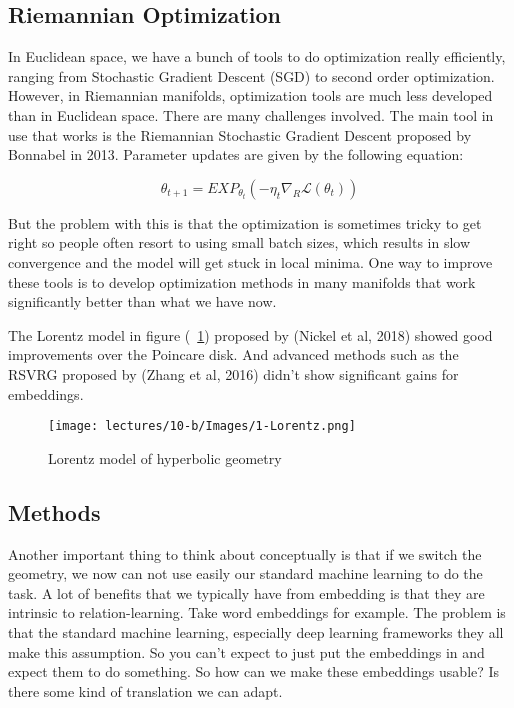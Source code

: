\subsection{Riemannian Optimization}

In Euclidean space, we have a bunch of tools to do optimization really efficiently, ranging from Stochastic Gradient Descent (SGD) to second order optimization. However, in Riemannian manifolds, optimization tools are much less developed than in Euclidean space. There are many challenges involved. The main tool in use that works is the Riemannian Stochastic Gradient Descent proposed by Bonnabel in 2013. Parameter updates are given by the following equation:

\begin{equation} \label{eq:RSGD}
    \theta_{t+1} = EXP_{\theta_t} (−\eta_t \nabla_R \mathcal{L}(\theta_t))
\end{equation}

But the problem with this is that the optimization is sometimes tricky to get right so people often resort to using small batch sizes, which results in slow convergence and the model will get stuck in local minima. One way to improve these tools is to develop optimization methods in many manifolds that work significantly better than what we have now.

The Lorentz model in figure (~\ref{fig:1-Lorentz}) proposed by (Nickel et al, 2018) showed good improvements over the Poincare disk. And advanced methods such as the RSVRG proposed by (Zhang et al, 2016) didn't show significant gains for embeddings.  

\begin{figure}[htb]
  \centering
    \texttt{[image: lectures/10-b/Images/1-Lorentz.png]}
    \caption{Lorentz model of hyperbolic geometry}
    \label{fig:1-Lorentz}
\end{figure}

\subsection{Methods}

Another important thing to think about conceptually is that if we switch the geometry, we now can not use easily our standard machine learning to do the task. A lot of benefits that we typically have from embedding is that they are intrinsic to relation-learning. Take word embeddings for example. The problem is that the standard machine learning, especially deep learning frameworks they all make this assumption. So you can't expect to just put the embeddings in and expect them to do something. So how can we make these embeddings usable? Is there some kind of translation we can adapt.

